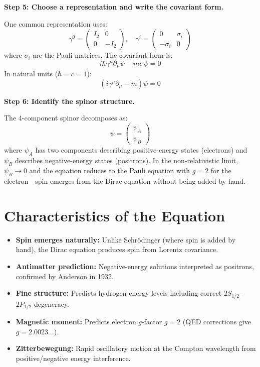 \textbf{Step 5: Choose a representation and write the covariant form.}

One common representation uses:
\begin{equation}
\gamma^0 = \begin{pmatrix} I_2 & 0 \\ 0 & -I_2 \end{pmatrix}, \quad \gamma^i = \begin{pmatrix} 0 & \sigma_i \\ -\sigma_i & 0 \end{pmatrix}
\end{equation}
where $\sigma_i$ are the Pauli matrices. The covariant form is:
\begin{equation}
i\hbar\gamma^\mu\partial_\mu\psi - mc\,\psi = 0
\end{equation}
In natural units ($\hbar = c = 1$):
\begin{equation}
\boxed{(i\gamma^\mu\partial_\mu - m)\psi = 0}
\end{equation}

\textbf{Step 6: Identify the spinor structure.}

The 4-component spinor decomposes as:
\begin{equation}
\psi = \begin{pmatrix} \psi_A \\ \psi_B \end{pmatrix}
\end{equation}
where $\psi_A$ has two components describing positive-energy states (electrons) and $\psi_B$ describes negative-energy states (positrons). In the non-relativistic limit, $\psi_B \to 0$ and the equation reduces to the Pauli equation with $g = 2$ for the electron---spin emerges from the Dirac equation without being added by hand.

\section*{Characteristics of the Equation}

\begin{itemize}
\item \textbf{Spin emerges naturally:} Unlike Schr\"odinger (where spin is added by hand), the Dirac equation produces spin from Lorentz covariance.
\item \textbf{Antimatter prediction:} Negative-energy solutions interpreted as positrons, confirmed by Anderson in 1932.
\item \textbf{Fine structure:} Predicts hydrogen energy levels including correct $2S_{1/2}$--$2P_{1/2}$ degeneracy.
\item \textbf{Magnetic moment:} Predicts electron $g$-factor $g = 2$ (QED corrections give $g = 2.0023\ldots$).
\item \textbf{Zitterbewegung:} Rapid oscillatory motion at the Compton wavelength from positive/negative energy interference.
\end{itemize}

